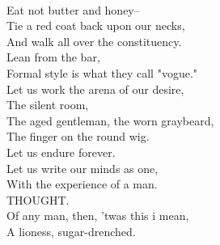 \documentclass[smalldemyvopaper,11pt,twoside,onecolumn,openright,extrafontsizes]{memoir}
\begin{document}
\\Eat not butter and honey--
\\Tie a red coat back upon our necks,
\\And walk all over the constituency.
\\Lean from the bar,
\\Formal style is what they call "vogue."
\\Let us work the arena of our desire,
\\The silent room,
\\The aged gentleman, the worn graybeard,
\\The finger on the round wig.
\\Let us endure forever.
\\Let us write our minds as one,
\\With the experience of a man.
\\THOUGHT.
\\Of any man, then, 'twas this i mean,
\\A lioness, sugar-drenched.
\end{document}
